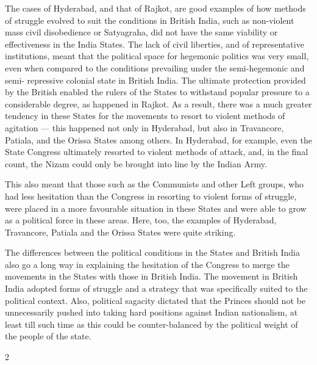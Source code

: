 \begin{multicols}{2}
The cases of Hyderabad, and that of Rajkot, are good examples of how methods of struggle evolved to suit the conditions in British India, such as non-violent mass civil disobedience or Satyagraha, did not have the same viability or effectiveness in the India States. The lack of civil liberties, and of representative institutions, meant that the political space for hegemonic politics was very small, even when compared to the conditions prevailing under the semi-hegemonic and semi- repressive colonial state in British India. The ultimate protection provided by the British enabled the rulers of the States to withstand popular pressure to a considerable degree, as happened in Rajkot. As a result, there was a much greater tendency in these States for the movements to resort to violent methods of agitation --- this happened not only in Hyderabad, but also in Travancore, Patiala, and the Orissa States among others. In Hyderabad, for example, even the State Congress ultimately resorted to violent methods of attack, and, in the final count, the Nizam could only be brought into line by the Indian Army. 

This also meant that those such as the Communists and other Left groups, who had less hesitation than the Congress in resorting to violent forms of struggle, were placed in a more favourable situation in these States and were able to grow as a political force in these areas. Here, too, the examples of Hyderabad, Travancore, Patiala and the Orissa States were quite striking. 

The differences between the political conditions in the States and British India also go a long way in explaining the hesitation of the Congress to merge the movements in the States with those in British India. The movement in British India adopted forms of struggle and a strategy that was specifically suited to the political context. Also, political sagacity dictated that the Princes should not be unnecessarily pushed into taking hard positions against Indian nationalism, at least till such time as this could be counter-balanced by the political weight of the people of the state.
\end{multicols}{2}
